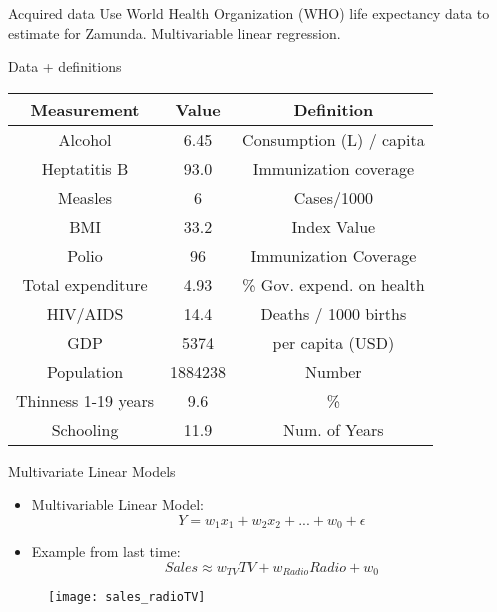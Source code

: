\documentclass{beamer}
\begin{document}
\begin{frame}{Acquired data}
	Use World Health Organization (WHO) life expectancy data to estimate for Zamunda. Multivariable linear regression.
	
	\begin{block}{Data + definitions}
		\begin{adjustbox}{max totalsize={.9\textwidth}{.7\textheight},center}
			
			\begin{tabular}{|c|c|c|}
				\hline
				\textbf{Measurement} &  \textbf{Value} & \textbf{Definition} \\
				\hline
				Alcohol & 6.45 & Consumption (L) / capita \\
				\hline
				Heptatitis B & 93.0 & Immunization coverage  \\
				\hline
				Measles & 6 & Cases/1000 \\
				\hline
				BMI & 33.2 & Index Value  \\
				\hline
				Polio & 96 & Immunization Coverage \\
				\hline
				Total expenditure & 4.93 & \% Gov. expend. on health  \\
				\hline
				HIV/AIDS & 14.4 & Deaths / 1000 births  \\
				\hline
				GDP & 5374 & per capita (USD)   \\
				\hline
				Population & 1884238 & Number  \\
				\hline
				Thinness 1-19 years & 9.6 &\% \\
				\hline
				Schooling & 11.9 & Num. of Years \\
				\hline
				
				
			\end{tabular}
			
		\end{adjustbox}
	\end{block}
	
\end{frame}

\begin{frame}{Multivariate Linear Models}
	\begin{itemize}
		\item Multivariable Linear Model: $$ Y = w_1x_1 + w_2x_2 + ... + w_0 + \epsilon $$
		\item Example from last time: $$ Sales \approx w_{TV} TV + w_{Radio} Radio + w_0$$
	\end{itemize}
	\begin{figure}[H]
		\begin{center}
		\texttt{[image: sales\_radioTV]}
		\end{center}
	\end{figure}
\end{frame}
\end{document}
